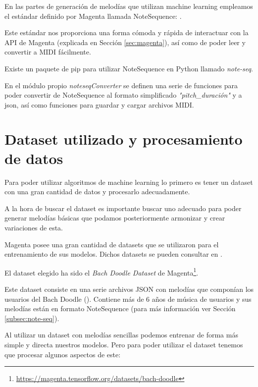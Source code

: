     En las partes de generación de melodías que utilizan machine learning empleamos el estándar definido por Magenta llamada NoteSequence: \cite{note-seq}. 

    Este estándar nos proporciona una forma cómoda y rápida de interactuar con la API de Magenta (explicada en Sección \ref{sec:magenta}), así como de poder leer y convertir a MIDI fácilmente.

    Existe un paquete de pip para utilizar NoteSequence en Python llamado \textit{note-seq}.

    En el módulo propio \textit{noteseqConverter} se definen una serie de funciones para poder convertir de NoteSequence al formato simplificado \textit{"pitch\_duración"} y a json, así como funciones para guardar y cargar archivos MIDI.

\section{Dataset utilizado y procesamiento de datos}
\label{sec:dataset}
Para poder utilizar algoritmos de machine learning lo primero es tener un dataset con una gran cantidad de datos y procesarlo adecuadamente.

A la hora de buscar el dataset es importante buscar uno adecuado para poder generar melodías básicas que podamos posteriormente armonizar y crear variaciones de esta.

Magenta posee una gran cantidad de datasets que se utilizaron para el entrenamiento de sus modelos. Dichos datasets se pueden consultar en \cite{MagentaDatasets}.

El dataset elegido ha sido el \textit{Bach Doodle Dataset} de Magenta\footnote{\url{https://magenta.tensorflow.org/datasets/bach-doodle}}.

Este dataset consiste en una serie archivos JSON con melodías que componían los usuarios del Bach Doodle (\cite{BachDoodlePaper}). Contiene más de 6 años de música de usuarios y sus melodías están en formato NoteSequence (para más información ver Sección \ref{subsec:note-seq}).

Al utilizar un dataset con melodías sencillas podemos entrenar de forma más simple y directa nuestros modelos. Pero para poder utilizar el dataset tenemos que procesar algunos aspectos de este:

